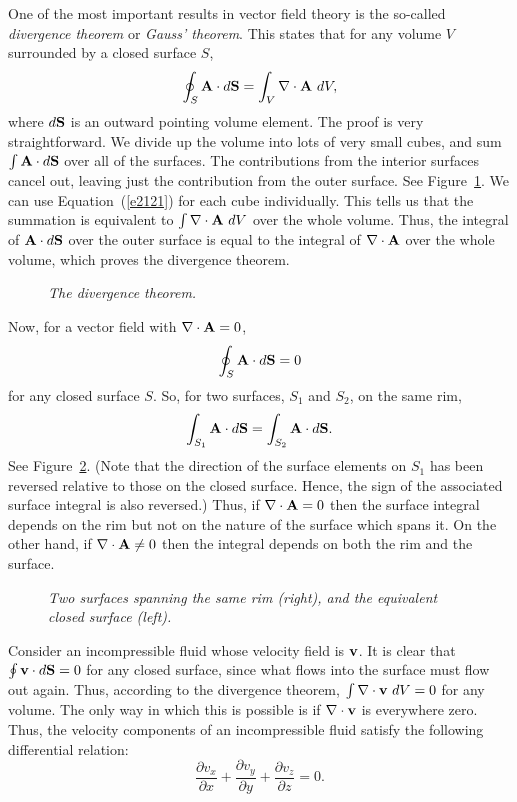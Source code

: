 One of the most important results in vector field theory is the so-called
{\em divergence theorem} or {\em Gauss' theorem}. This states that for any volume
$V$ surrounded by a closed surface $S$,
\begin{equation}
\oint_S {\bf A}\cdot d{\bf S} = \int_V \nabla\cdot{\bf A}\,\,dV,
\end{equation}
where $d{\bf S}$ is an outward pointing volume element. 
The proof is very
 straightforward. We divide up the volume into lots of very small cubes, and
sum $\int {\bf A}\cdot d{\bf S}$ over all of the surfaces. The contributions
from the interior surfaces cancel out, leaving just the contribution from the outer
surface. See Figure~\ref{f18}. We can use Equation~(\ref{e2121}) for each cube individually. This tells us that
the summation is equivalent to $\int \nabla\cdot{\bf A}\,\,dV$ over the whole
volume. Thus, the integral of ${\bf A}\cdot d{\bf S}$ over the outer surface is
equal to the integral of $\nabla\cdot{\bf A}$ over the whole volume, which
proves the divergence theorem.
\begin{figure}
\epsfysize=2.5in
\centerline{}
\caption{\em The divergence theorem.}\label{f18}
\end{figure}

Now, for a vector field with $\nabla\cdot{\bf A} = 0$,
\begin{equation}
\oint_S {\bf A}\cdot d{\bf S} =0 
\end{equation}
for any closed surface $S$. So, for two surfaces,
$S_1$ and $S_2$, on the same rim,
\begin{equation}
\int_{S_1} {\bf A}\cdot d{\bf S} = \int_{S_2} {\bf A}\cdot d{\bf S}.
\end{equation}
See Figure~\ref{f19}. (Note that the direction of the surface elements on $S_1$ has been reversed relative to those on the closed surface. Hence, the
sign of the associated surface integral is also reversed.)
Thus, if $\nabla\cdot{\bf A}=0$ then the surface integral depends on the rim but
not on the nature of the surface which spans it. 
On the other hand, if $\nabla\cdot{\bf A}\neq 0 $ then the integral
depends on both the rim and the surface. 
\begin{figure}
\centerline{}
\caption{\em Two surfaces spanning the same rim (right), and the
equivalent closed surface (left).}\label{f19}
\end{figure}

Consider an incompressible fluid whose velocity field is ${\bf v}$. It is clear that
$\oint {\bf v}\cdot d{\bf S} = 0$ for any closed surface, since what flows into the
surface must flow out again. Thus, according to the divergence theorem,
$\int \nabla\cdot{\bf v}\,\,dV = 0$ for any volume. The only way in which this is
possible is if $\nabla\cdot{\bf v}$ is everywhere zero. Thus,  the velocity components
of an incompressible fluid satisfy the following differential relation:
\begin{equation}
\frac{\partial v_x}{\partial x} + \frac{\partial v_y}{\partial y} + 
\frac{\partial v_z}
{\partial z}=0.
\end{equation}

